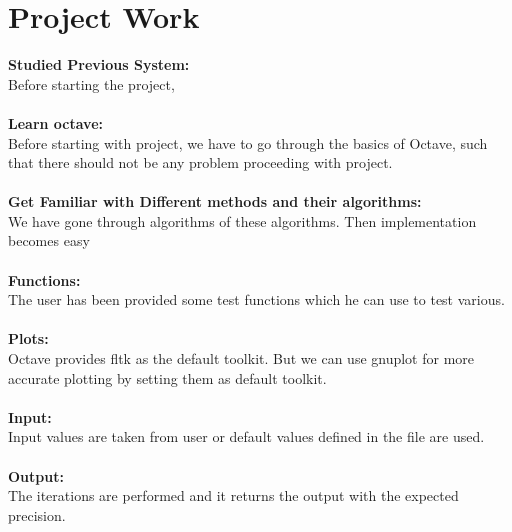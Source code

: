 \section{Project Work} 
\textbf{Studied Previous System:}\\
Before starting the project, \\\\
\textbf{Learn octave:}\\
Before starting with project, we have to go through the basics of Octave, such that there
should not be any problem proceeding with project.\\\\
\textbf{Get Familiar with Different methods and their algorithms:}\\
We have gone through algorithms of these algorithms. Then implementation becomes easy\\\\
\textbf{Functions:}\\
The user has been provided some test functions which he can use to test various.\\\\
\textbf{Plots:}\\
Octave provides fltk as the default toolkit. But we can use gnuplot for more accurate plotting by setting them as default toolkit.\\\\
\textbf{Input:}\\
Input values are taken from user or default values defined in the file are used.\\\\
\textbf{Output:}\\
The iterations are performed and it returns the output with the expected precision.

